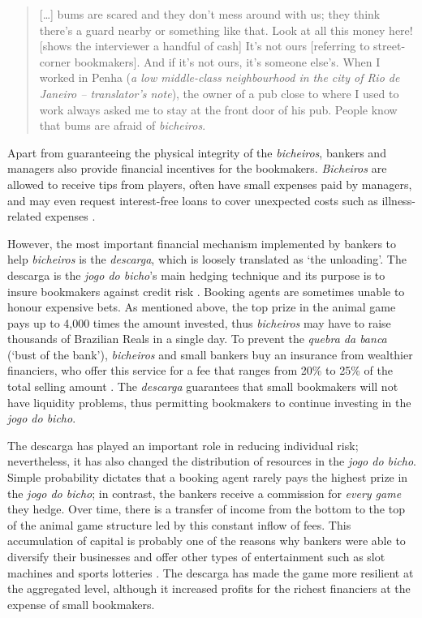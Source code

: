 \documentclass[a4paper,12pt]{article}
\begin{document}
\begin{quote}
 [\dots] bums are scared and they don't mess around with us; they think there's a guard nearby or something like that. Look at all this money here! [shows the interviewer a handful of cash] It's not ours [referring to street-corner bookmakers]. And if it's not ours, it's someone else's. When I worked in Penha (\emph{a low middle-class neighbourhood in the city of Rio de Janeiro -- translator's note}), the owner of a pub close to where I used to work always asked me to stay at the front door of his pub. People know that bums are afraid of \emph{bicheiros}.
\end{quote}

Apart from guaranteeing the physical integrity of the \emph{bicheiros}, bankers and managers also provide financial incentives for the bookmakers. \emph{Bicheiros} are allowed to receive tips from players, often have small expenses paid by managers, and may even request interest-free loans to cover unexpected costs such as illness-related expenses \citep{labronici2012paratodos}.

However, the most important financial mechanism implemented by bankers to help \emph{bicheiros} is the \emph{descarga}, which is loosely translated as `the unloading'. The descarga is the \emph{jogo do bicho}'s main hedging technique and its purpose is to insure bookmakers against credit risk \citetext{\citealp[59]{labronici2012paratodos}; \citealp[178]{magalhaes2005ganhou}; \citealp[16]{misse2007illegal}; \citealp[75]{soares1993jogo}}. Booking agents are sometimes unable to honour expensive bets. As mentioned above, the top prize in the animal game pays up to 4,000 times the amount invested, thus \emph{bicheiros} may have to raise thousands of Brazilian Reals in a single day. To prevent the \emph{quebra da banca} (`bust of the bank'), \emph{bicheiros} and small bankers buy an insurance from wealthier financiers, who offer this service for a fee that ranges from 20\% to 25\% of the total selling amount \citep{fsp2006descarga}. The \emph{descarga} guarantees that small bookmakers will not have liquidity problems, thus permitting bookmakers to continue investing in the \emph{jogo do bicho}.

The descarga has played an important role in reducing individual risk; nevertheless, it has also changed the distribution of resources in the \emph{jogo do bicho}. Simple probability dictates that a booking agent rarely pays the highest prize in the \emph{jogo do bicho}; in contrast, the bankers receive a commission for \emph{every game} they hedge. Over time, there is a transfer of income from the bottom to the top of the animal game structure led by this constant inflow of fees. This accumulation of capital is probably one of the reasons why bankers were able to diversify their businesses and offer other types of entertainment such as slot machines and sports lotteries \citep{estado2006cacaniquel,globo2015cacaniquel,terra2011cacaniquel}. The descarga has made the game more resilient at the aggregated level, although it increased profits for the richest financiers at the expense of small bookmakers.
\end{document}
